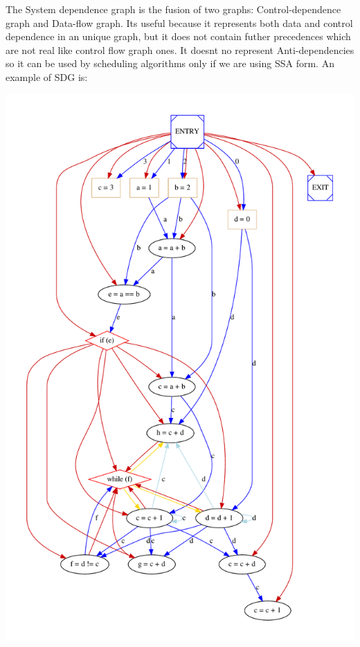 The System dependence graph is the fusion of two graphs\+: Control-\/dependence graph and Data-\/flow graph. It\textquotesingle{}s useful because it represents both data and control dependence in an unique graph, but it does not contain futher precedences which are not real like control flow graph ones. It doesn\textquotesingle{}t no represent Anti-\/dependencies so it can be used by scheduling algorithms only if we are using S\+SA form. An example of S\+DG is\+: 
\begin{DoxyImageNoCaption}
  \mbox{\includegraphics[width=\textwidth,height=\textheight/2,keepaspectratio=true]{dot_inline_dotgraph_6}}
\end{DoxyImageNoCaption}


